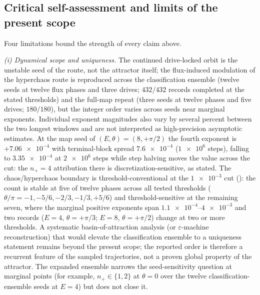 \documentclass[preprint,numbers,a4paper]{elsarticle}
\begin{document}
\subsection{Critical self-assessment and limits of the present scope}
\label{sec:limits}

Four limitations bound the strength of every claim above.

\emph{(i) Dynamical scope and uniqueness.} The continued drive-locked orbit is the unstable seed of the route, not the attractor itself; the flux-induced modulation of the hyperchaos route is reproduced across the classification ensemble (twelve seeds at twelve flux phases and three drives; $\num{432}/\num{432}$ records completed at the stated thresholds) and the full-map repeat (three seeds at twelve phases and five drives; $\num{180}/\num{180}$), but the integer order varies across seeds near marginal exponents. Individual exponent magnitudes also vary by several percent between the two longest windows and are not interpreted as high-precision asymptotic estimates. At the map seed of $(E,\theta)=(8,+\pi/2)$ the fourth exponent is $+\num{7.06e-4}$ with terminal-block spread $\num{7.6e-4}$ ($\num{1e6}$ steps), falling to $\num{3.35e-4}$ at $\num{2e6}$ steps while step halving moves the value across the cut: the $n_+=4$ attribution there is discretization-sensitive, as stated. The chaos/hyperchaos boundary is threshold-conventional at the $\num{1e-3}$ cut (): the count is stable at five of twelve phases across all tested thresholds ($\theta/\pi=-1,-5/6,-2/3,-1/3,+5/6$) and threshold-sensitive at the remaining seven, where the marginal positive exponents span $\num{1.1e-4}$--$\num{4e-3}$ and two records ($E=\num{4}$, $\theta=+\pi/3$; $E=\num{8}$, $\theta=+\pi/2$) change at two or more thresholds. A systematic basin-of-attraction analysis (or $\varepsilon$-machine reconstruction) that would elevate the classification ensemble to a uniqueness statement remains beyond the present scope; the reported order is therefore a recurrent feature of the sampled trajectories, not a proven global property of the attractor. The expanded ensemble narrows the seed-sensitivity question at marginal points (for example, $n_+\in\{1,2\}$ at $\theta=0$ over the twelve classification-ensemble seeds at $E=\num{4}$) but does not close it.
\end{document}
